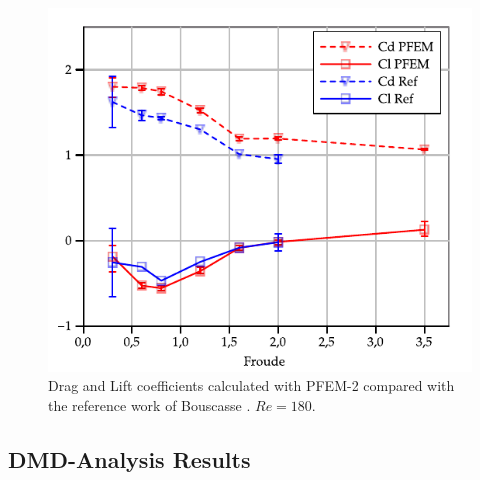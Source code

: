 \begin{figure}[ht]
  \centering
  \includegraphics[width=0.95\columnwidth]{images_10thspheric/CdCl_Re180_hd_0_55.pdf}
  \caption{Drag and Lift coefficients calculated with PFEM-2 compared with the reference work of Bouscasse \cite{Bouscasse14}. $Re=180$.} %
  \label{fg:CdCl}
\end{figure}

\subsection{DMD-Analysis Results}

